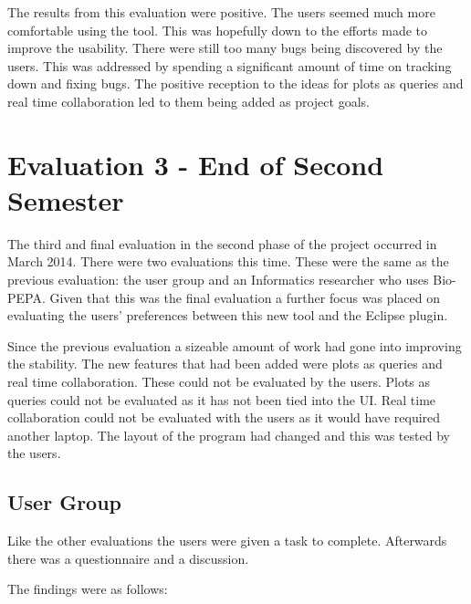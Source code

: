 The results from this evaluation were positive.  The users seemed much more comfortable using the tool.  This was hopefully down to the efforts made to improve the usability.  There were still too many bugs being discovered by the users.  This was addressed by spending a significant amount of time on tracking down and fixing bugs.  The positive reception to the ideas for plots as queries and real time collaboration led to them being added as project goals.

\section{Evaluation 3 - End of Second Semester}

The third and final evaluation in the second phase of the project occurred in March 2014.  There were two evaluations this time.  These were the same as the previous evaluation: the user group and an Informatics researcher who uses Bio-PEPA.  Given that this was the final evaluation a further focus was placed on evaluating the users' preferences between this new tool and the Eclipse plugin.

Since the previous evaluation a sizeable amount of work had gone into improving the stability.  The new features that had been added were plots as queries and real time collaboration.  These could not be evaluated by the users. Plots as queries could not be evaluated as it has not been tied into the \ac{UI}.  Real time collaboration could not be evaluated with the users as it would have required another laptop.  The layout of the program had changed and this was tested by the users.

\subsection{User Group}

Like the other evaluations the users were given a task to complete.  Afterwards there was a questionnaire and a discussion.

The findings were as follows:


